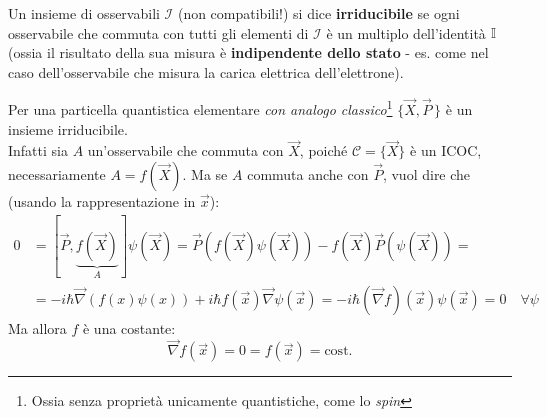 \documentclass[../../FisicaTeorica.tex]{subfiles}
\begin{document}
\begin{dfn}
Un insieme di osservabili $\mathcal{I}$ (non compatibili!) si dice \textbf{irriducibile} se ogni osservabile che commuta con tutti gli elementi di $\mathcal{I}$ è un multiplo dell'identità $\mathbb{I}$ (ossia il risultato della sua misura è  \textbf{indipendente dello stato} - es. come nel caso dell'osservabile che misura la carica elettrica dell'elettrone).\\
\begin{comment} %
Ciò significa che misurare tutte le osservabili in $\mathcal{I}$ non può ridurre il sistema ad uno stato di massima informazione (puro).%
\end{comment}
\end{dfn}
\begin{oss}
Per una particella quantistica elementare \textit{con analogo classico}\footnote{Ossia senza proprietà unicamente quantistiche, come lo \textit{spin}} $\{\vec{X},\vec{P}\,\}$ è un insieme irriducibile.\\ %
Infatti sia $A$ un'osservabile che commuta con $\vec{X}$, poiché $\mathcal{C}=\{\vec{X}\}$ è un ICOC, necessariamente $A=f(\vec{X})$. Ma se $A$ commuta anche con $\vec{P}$, vuol dire che (usando la rappresentazione in $\vec{x}$):
\begin{align*}
0&=[\vec{P}, \underbrace{f(\vec{X})}_{A}]\psi(\vec{X})=
\vec{P}(f(\vec{X})\psi(\vec{X}))-f(\vec{X})\vec{P}(\psi(\vec{X}))=\\
&=-i\hbar \vec{\nabla}(f(x)\psi(x))+i\hbar f(\vec{x})\vec{\nabla}\psi(\vec{x}) = -i\hbar(\vec{\nabla}f)(\vec{x})\psi(\vec{x})=0 \quad \forall \psi
\end{align*}
Ma allora $f$ è una costante:
\[
\vec{\nabla}f(\vec{x})=0=f(\vec{x})=\text{cost.}
\]
\end{oss}
\end{document}
